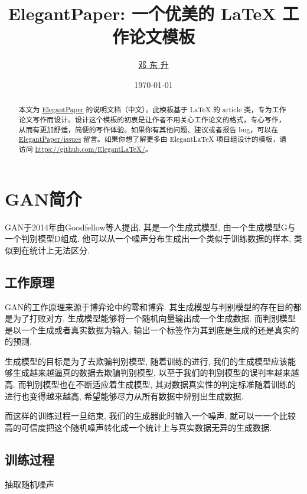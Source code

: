 \documentclass[lang=cn,11pt]{elegantpaper}
\title{ElegantPaper: 一个优美的 \LaTeX{} 工作论文模板}
\author{\href{https://ddswhu.me/}{邓 东 升}}
\institute{\href{https://elegantlatex.org/}{Elegant\LaTeX{} 项目组}}
\date{\today}
\begin{document}
\maketitle

\begin{abstract}
\noindent 本文为 \href{https://github.com/ElegantLaTeX/ElegantPaper/}{ElegantPaper} 的说明文档（中文）。此模板基于 \LaTeX{} 的 article 类，专为工作论文写作而设计。设计这个模板的初衷是让作者不用关心工作论文的格式，专心写作，从而有更加舒适，简便的写作体验。如果你有其他问题、建议或者报告 bug，可以在 \href{https://github.com/ElegantLaTeX/ElegantPaper/issues}{ElegantPaper/issues} 留言。如果你想了解更多由 Elegant\LaTeX{} 项目组设计的模板，请访问 \href{https://github.com/ElegantLaTeX/}{https://github.com/ElegantLaTeX/}。
\end{abstract}


\section{GAN简介}

GAN于2014年由Goodfellow等人提出. 其是一个生成式模型, 由一个生成模型G与一个判别模型D组成. 他可以从一个噪声分布生成出一个类似于训练数据的样本, 类似到在统计上无法区分. 

\subsection{工作原理}

GAN的工作原理来源于博弈论中的零和博弈. 其生成模型与判别模型的存在目的都是为了打败对方. 生成模型能够将一个随机向量输出成一个生成数据. 而判别模型是以一个生成或者真实数据为输入, 输出一个标签作为其到底是生成的还是真实的的预测.

生成模型的目标是为了去欺骗判别模型, 随着训练的进行, 我们的生成模型应该能够生成越来越逼真的数据去欺骗判别模型, 以至于我们的判别模型的误判率越来越高. 而判别模型也在不断适应着生成模型, 其对数据真实性的判定标准随着训练的进行也变得越来越高, 希望能够尽力从所有数据中辨别出生成数据. 

而这样的训练过程一旦结束, 我们的生成器此时输入一个噪声, 就可以一一个比较高的可信度把这个随机噪声转化成一个统计上与真实数据无异的生成数据. 

\subsection{训练过程}

抽取随机噪声
\end{document}
